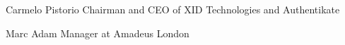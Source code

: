 
\begin{cvskills}
\cvskill
  {Carmelo Pistorio} %
  {Chairman and CEO of XID Technologies and Authentikate} %

\cvskill
    {Marc Adam} %
    {Manager at Amadeus London}  %

\end{cvskills}